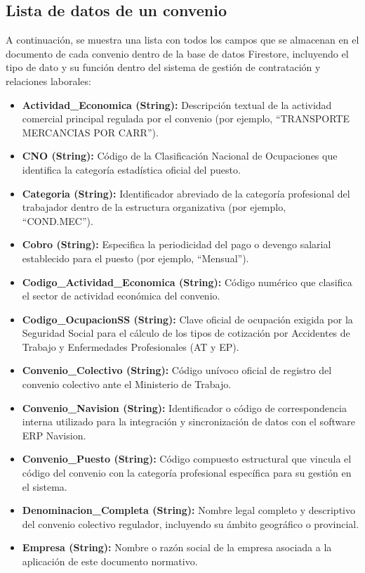 \subsection{Lista de datos de un convenio}
A continuación, se muestra una lista con todos los campos que se almacenan en el documento de cada convenio dentro de la base de datos Firestore, incluyendo el tipo de dato y su función dentro del sistema de gestión de contratación y relaciones laborales:
\begin{itemize}
    \item \textbf{Actividad\_Economica (String):} Descripción textual de la actividad comercial principal regulada por el convenio (por ejemplo, ``TRANSPORTE MERCANCIAS POR CARR'').
    \item \textbf{CNO (String):} Código de la Clasificación Nacional de Ocupaciones que identifica la categoría estadística oficial del puesto.
    \item \textbf{Categoria (String):} Identificador abreviado de la categoría profesional del trabajador dentro de la estructura organizativa (por ejemplo, ``COND.MEC'').
    \item \textbf{Cobro (String):} Especifica la periodicidad del pago o devengo salarial establecido para el puesto (por ejemplo, ``Mensual'').
    \item \textbf{Codigo\_Actividad\_Economica (String):} Código numérico que clasifica el sector de actividad económica del convenio.
    \item \textbf{Codigo\_OcupacionSS (String):} Clave oficial de ocupación exigida por la Seguridad Social para el cálculo de los tipos de cotización por Accidentes de Trabajo y Enfermedades Profesionales (AT y EP).
    \item \textbf{Convenio\_Colectivo (String):} Código unívoco oficial de registro del convenio colectivo ante el Ministerio de Trabajo.
    \item \textbf{Convenio\_Navision (String):} Identificador o código de correspondencia interna utilizado para la integración y sincronización de datos con el software ERP Navision.
    \item \textbf{Convenio\_Puesto (String):} Código compuesto estructural que vincula el código del convenio con la categoría profesional específica para su gestión en el sistema.
    \item \textbf{Denominacion\_Completa (String):} Nombre legal completo y descriptivo del convenio colectivo regulador, incluyendo su ámbito geográfico o provincial.
    \item \textbf{Empresa (String):} Nombre o razón social de la empresa asociada a la aplicación de este documento normativo.

\end{itemize}
